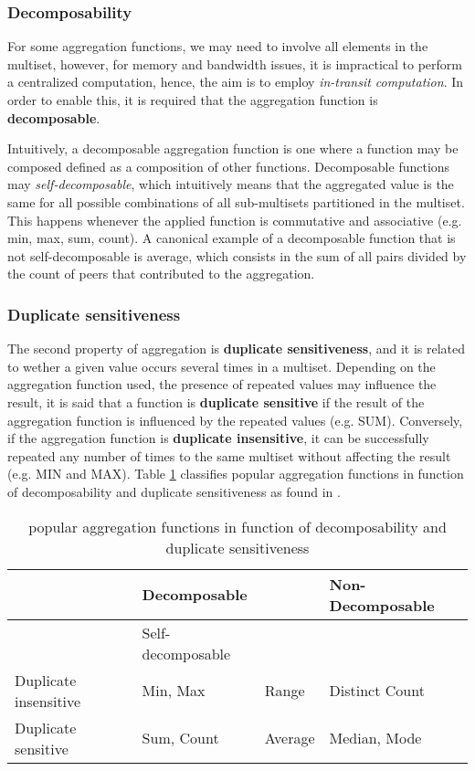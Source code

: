 \subsubsection*{Decomposability}

For some aggregation functions, we may need to involve all elements in the multiset, however, for memory and bandwidth issues, it is impractical to perform a centralized computation, hence, the aim is to employ \textit{in-transit computation}. In order to enable this, it is required that the aggregation function is \textbf{decomposable}. 

Intuitively, a decomposable aggregation function is one where a function may be composed defined as a composition of other functions. Decomposable functions may \textit{self-decomposable}, which intuitively means that the aggregated value is the same for all possible combinations of all sub-multisets partitioned in the multiset. This happens whenever the applied function is commutative and associative (e.g. min, max, sum, count). A canonical example of a decomposable function that is not self-decomposable is average, which consists in the sum of all pairs divided by the count of peers that contributed to the aggregation.

\subsubsection*{Duplicate sensitiveness}

The second property of aggregation is \textbf{duplicate sensitiveness}, and it is related to wether a given value occurs several times in a multiset. Depending on the aggregation function used, the presence of repeated values may influence the result, it is said that a function is \textbf{duplicate sensitive} if the result of the aggregation function is influenced by the repeated values (e.g. SUM). Conversely, if the aggregation function is \textbf{duplicate insensitive}, it can be successfully repeated any number of times to the same multiset without affecting the result (e.g. MIN and MAX). Table \ref{table:aggregation_functions} classifies popular aggregation functions in function of decomposability and duplicate sensitiveness as found in \cite{DBLP:journals/corr/abs-1110-0725}.

\begin{table}[]
    \begin{tabular}{|l|l|l|l|}
    \hline
                          & \multicolumn{2}{l|}{Decomposable} & Non-Decomposable  \\ \hline
                          & Self-decomposable    &                             &  \\ \hline
    Duplicate insensitive & Min, Max             & Range     & Distinct Count    \\ \hline
    Duplicate sensitive   & Sum, Count           & Average   & Median, Mode     \\ \hline
    \end{tabular}
    \caption{popular aggregation functions in function of decomposability and duplicate sensitiveness}
    \label{table:aggregation_functions}
\end{table}

